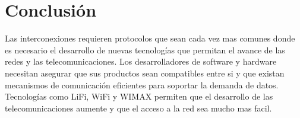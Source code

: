 \documentclass[10pt,journal,compsoc]{IEEEtran}
\begin{document}
%






\section{Conclusión}

Las interconexiones requieren protocolos que sean cada vez mas comunes donde es necesario el desarrollo de nuevas tecnologías que permitan el avance de las redes y las telecomunicaciones. Los desarrolladores de software y hardware necesitan asegurar que sus productos sean compatibles entre si y que existan mecanismos de comunicación eficientes para soportar la demanda de datos. Tecnologías como LiFi, WiFi y WIMAX permiten que el desarrollo de las telecomunicaciones aumente y que el acceso a la red sea mucho mas facil.
\end{document}
